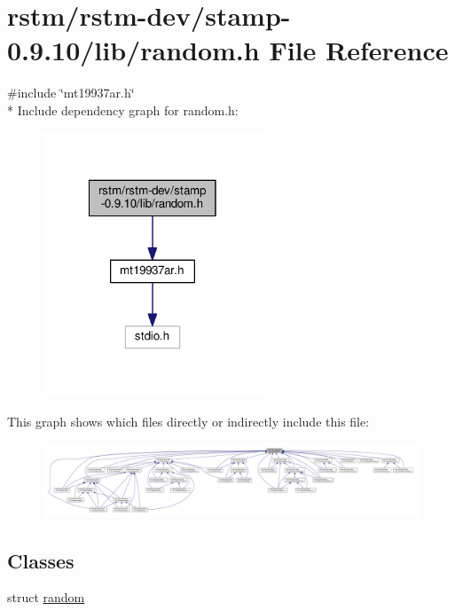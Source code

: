 \hypertarget{rstm_2rstm-dev_2stamp-0_89_810_2lib_2random_8h}{\section{rstm/rstm-\/dev/stamp-\/0.9.10/lib/random.h File Reference}
\label{rstm_2rstm-dev_2stamp-0_89_810_2lib_2random_8h}
}
{\ttfamily \#include \char`\"{}mt19937ar.\-h\char`\"{}}\\*
Include dependency graph for random.\-h\-:
\nopagebreak
\begin{figure}[H]
\begin{center}
\leavevmode
\includegraphics[width=186pt]{rstm_2rstm-dev_2stamp-0_89_810_2lib_2random_8h__incl}
\end{center}
\end{figure}
This graph shows which files directly or indirectly include this file\-:
\nopagebreak
\begin{figure}[H]
\begin{center}
\leavevmode
\includegraphics[width=350pt]{rstm_2rstm-dev_2stamp-0_89_810_2lib_2random_8h__dep__incl}
\end{center}
\end{figure}
\subsection*{Classes}
\begin{DoxyCompactItemize}
\item 
struct \hyperlink{structrandom}{random}
\end{DoxyCompactItemize}
